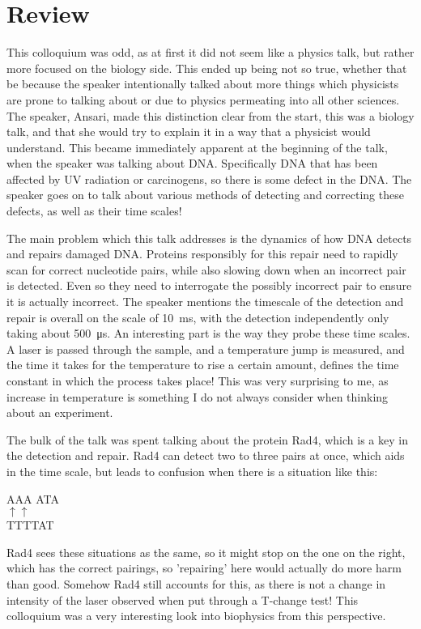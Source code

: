 \documentclass[12pt]{article}
\begin{document}
\section{Review}
This colloquium was odd, as at first it did not seem like a physics talk, but rather more focused on the biology side. This ended up being not so true, whether that be because the speaker intentionally talked about more things which physicists are prone to talking about or due to physics permeating into all other sciences. The speaker, Ansari, made this distinction clear from the start, this was a biology talk, and that she would try to explain it in a way that a physicist would understand. This became immediately apparent at the beginning of the talk, when the speaker was talking about DNA. Specifically DNA that has been affected by UV radiation or carcinogens, so there is some defect in the DNA. The speaker goes on to talk about various methods of detecting and correcting these defects, as well as their time scales!

The main problem which this talk addresses is the dynamics of how DNA detects and repairs damaged DNA. Proteins responsibly for this repair need to rapidly scan for correct nucleotide pairs, while also slowing down when an incorrect pair is detected. Even so they need to interrogate the possibly incorrect pair to ensure it is actually incorrect. The speaker mentions the timescale of the detection and repair is overall on the scale of \SI{10}{\ms}, with the detection independently  only taking about \SI{500}{\micro\s}. An interesting part is the way they probe these time scales. A laser is passed through the sample, and a temperature jump is measured, and the time it takes for the temperature to rise a certain amount, defines the time constant in which the process takes place! This was very surprising to me, as increase in temperature is something I do not always consider when thinking about an experiment.

The bulk of the talk was spent talking about the protein Rad4, which is a key in the detection and repair. Rad4 can detect two to three pairs at once, which aids in the time scale, but leads to confusion when there is a situation like this:
\begin{center}
  AAA \quad ATA\\
  $\uparrow$\qquad$\uparrow$\\
  TTT\quad TAT
\end{center}
Rad4 sees these situations as the same, so it might stop on the one on the right, which has the correct pairings, so 'repairing' here would actually do more harm than good. Somehow Rad4 still accounts for this, as there is not a change in intensity of the laser observed when put through a T-change test! This colloquium was a very interesting look into biophysics from this perspective.
\end{document}
